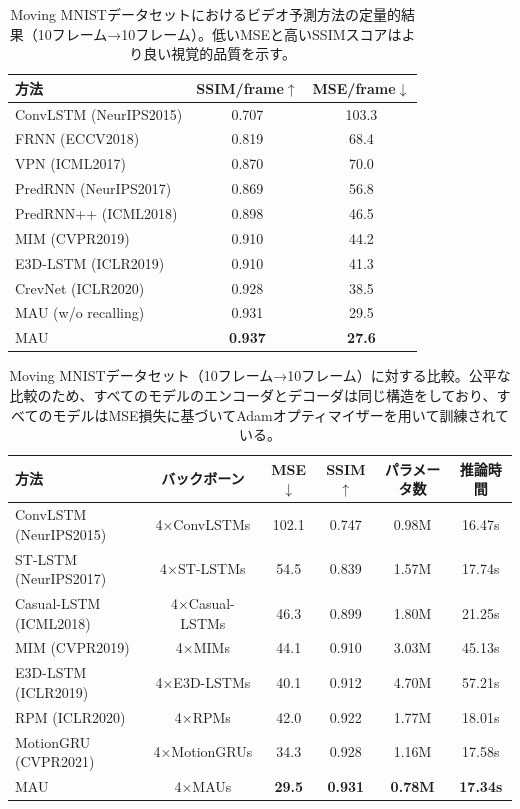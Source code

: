         \begin{table}[hptb]
          \centering
          \caption{Moving MNISTデータセットにおけるビデオ予測方法の定量的結果（10フレーム→10フレーム）。低いMSEと高いSSIMスコアはより良い視覚的品質を示す。}
          \label{mau-mnist-1}
          \begin{tabular}{lcc}
          \hline
          \textbf{方法} & \textbf{SSIM/frame$\uparrow$} & \textbf{MSE/frame$\downarrow$} \\ \hline
          ConvLSTM (NeurIPS2015) & 0.707 & 103.3 \\
          FRNN (ECCV2018)  & 0.819 & 68.4 \\
          VPN (ICML2017) & 0.870 & 70.0 \\
          PredRNN (NeurIPS2017) & 0.869 & 56.8 \\
          PredRNN++ (ICML2018) & 0.898 & 46.5 \\
          MIM (CVPR2019) & 0.910 & 44.2 \\
          E3D-LSTM (ICLR2019) & 0.910 & 41.3 \\
          CrevNet (ICLR2020) & 0.928 & 38.5 \\
          MAU (w/o recalling) & 0.931 & 29.5 \\
          MAU & \textbf{0.937} & \textbf{27.6} \\ \hline
          \end{tabular}
        \end{table}
          
        \begin{table}[hptb]
          \centering
          \caption{Moving MNISTデータセット（10フレーム→10フレーム）に対する比較。公平な比較のため、すべてのモデルのエンコーダとデコーダは同じ構造をしており、すべてのモデルはMSE損失に基づいてAdamオプティマイザーを用いて訓練されている。}
          \label{mau-mnist-2}
          \begin{tabular}{lccccc}
          \hline
          \textbf{方法}            & \textbf{バックボーン} & \textbf{MSE$\downarrow$} & \textbf{SSIM$\uparrow$} & \textbf{パラメータ数} & \textbf{推論時間} \\ \hline
          ConvLSTM (NeurIPS2015) & 4×ConvLSTMs   & 102.1  & 0.747  & 0.98M   & 16.47s \\
          ST-LSTM (NeurIPS2017)  & 4×ST-LSTMs    & 54.5   & 0.839  & 1.57M   & 17.74s \\
          Casual-LSTM (ICML2018) & 4×Casual-LSTMs & 46.3   & 0.899  & 1.80M   & 21.25s \\
          MIM (CVPR2019)     & 4×MIMs        & 44.1   & 0.910  & 3.03M   & 45.13s \\
          E3D-LSTM (ICLR2019) & 4×E3D-LSTMs   & 40.1   & 0.912  & 4.70M   & 57.21s \\
          RPM (ICLR2020)     & 4×RPMs        & 42.0   & 0.922  & 1.77M   & 18.01s \\
          MotionGRU (CVPR2021)& 4×MotionGRUs  & 34.3   & 0.928  & 1.16M   & 17.58s \\
          MAU                 & 4×MAUs        & \textbf{29.5}   & \textbf{0.931}  & \textbf{0.78M}   & \textbf{17.34s} \\ \hline
          \end{tabular}
        \end{table}
